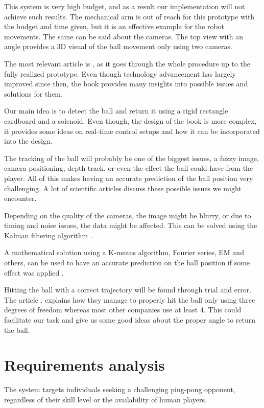 This system is very high budget, and as a result our implementation will not achieve such results. The mechanical arm is out of reach for this prototype with the budget and time given, but it is an effective example for the robot movements. The same can be said about the cameras. The top view with an angle provides a 3D visual of the ball movement only using two cameras.

The most relevant article is \cite{Acosta2004}, as it goes through the whole procedure up to the fully realized prototype. Even though technology advancement has largely improved since then, the book provides many insights into possible issues and solutions for them.

Our main idea is to detect the ball and return it using a rigid rectangle cardboard and a solenoid. Even though, the design of the book \cite{Yu2012} is more complex, it provides some ideas on real-time control setups and how it can be incorporated into the design.

The tracking of the ball will probably be one of the biggest issues, a fuzzy image, camera positioning, depth track, or even the effect the ball could have from the player. All of this makes having an accurate prediction of the ball position very challenging. A lot of scientific articles discuss these possible issues we might encounter.

Depending on the quality of the cameras, the image might be blurry, or due to timing and noise issues, the data might be affected. This can be solved using the Kalman filtering algorithm \cite{Lu2020}.

A mathematical solution using a K-means algorithm, Fourier series, EM and others, can be used to have an accurate prediction on the ball position if some effect was applied  \cite{Zhao2017}.

Hitting the ball with a correct trajectory will be found through trial and error. The article \cite{Trasloheros2014}. explains how they manage to properly hit the ball only using three degrees of freedom whereas most other companies use at least 4. This could facilitate our task and give us some good ideas about the proper angle to return the ball.


\section{Requirements analysis}

The system targets individuals seeking a challenging ping-pong opponent, regardless of their skill level or the availability of human players.

